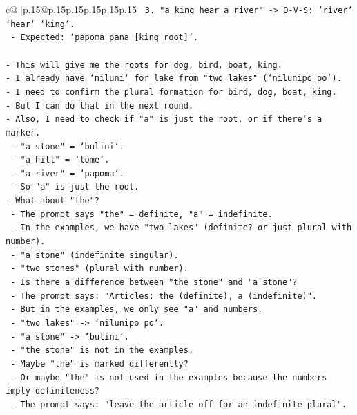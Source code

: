 \documentclass{article}
\begin{document}
{\begin{supertabular}{c@{$\;$}|p{.15\linewidth}@{}p{.15\linewidth}p{.15\linewidth}p{.15\linewidth}p{.15\linewidth}p{.15\linewidth}}
{{{\texttt{  3. "a king hear a river" {-}> O{-}V{-}S: `river` `hear` `king`.} \\
\texttt{     {-} Expected: `papoma pana {[}king\_root{]}`.} \\
\\ 
\texttt{{-} This will give me the roots for dog, bird, boat, king.} \\
\texttt{{-} I already have `niluni` for lake from "two lakes" (`nilunipo po`).} \\
\texttt{{-} I need to confirm the plural formation for bird, dog, boat, king.} \\
\texttt{{-} But I can do that in the next round.} \\
\texttt{{-} Also, I need to check if "a" is just the root, or if there's a marker.} \\
\texttt{  {-} "a stone" = `bulini`.} \\
\texttt{  {-} "a hill" = `lome`.} \\
\texttt{  {-} "a river" = `papoma`.} \\
\texttt{  {-} So "a" is just the root.} \\
\texttt{{-} What about "the"?} \\
\texttt{  {-} The prompt says "the" = definite, "a" = indefinite.} \\
\texttt{  {-} In the examples, we have "two lakes" (definite? or just plural with number).} \\
\texttt{  {-} "a stone" (indefinite singular).} \\
\texttt{  {-} "two stones" (plural with number).} \\
\texttt{  {-} Is there a difference between "the stone" and "a stone"?} \\
\texttt{  {-} The prompt says: "Articles: the (definite), a (indefinite)".} \\
\texttt{  {-} But in the examples, we only see "a" and numbers.} \\
\texttt{  {-} "two lakes" {-}> `nilunipo po`.} \\
\texttt{  {-} "a stone" {-}> `bulini`.} \\
\texttt{  {-} "the stone" is not in the examples.} \\
\texttt{  {-} Maybe "the" is marked differently?} \\
\texttt{  {-} Or maybe "the" is not used in the examples because the numbers imply definiteness?} \\
\texttt{  {-} The prompt says: "leave the article off for an indefinite plural".} \\
}}}
\end{supertabular}}
\end{document}

